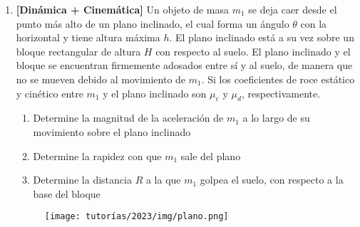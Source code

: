 \documentclass[letterpaper,11pt]{article}
\begin{document}
\begin{enumerate}
\begin{multicols}{2}
\columnbreak

\begin{figure}[H]
    \centering
    \texttt{[image: tutorías/2023/img/ski.png]}
\end{figure}

\end{multicols}
\item \textbf{[Dinámica + Cinemática]} Un objeto de masa $m_1$ se deja caer desde el punto más alto de un plano inclinado, el cual forma un ángulo $\theta$ con la horizontal y tiene altura máxima $h$. El plano inclinado está a su vez sobre un bloque rectangular de altura $H$ con respecto al suelo. El plano inclinado y el bloque se encuentran firmemente adosados entre sí y al suelo, de manera que no se mueven debido al movimiento de $m_1$. Si los coeficientes de roce estático y cinético entre $m_1$ y el plano inclinado son $\mu_e$ y $\mu_d$, respectivamente. 

\begin{enumerate}
    \item Determine la magnitud de la aceleración de $m_1$ a lo largo de su movimiento sobre el plano inclinado

    \item Determine la rapidez con que $m_1$ sale del plano

    \item Determine la distancia $R$ a la que $m_1$ golpea el suelo, con respecto a la base del bloque
\end{enumerate}

\begin{figure}[H]
    \centering
    \texttt{[image: tutorías/2023/img/plano.png]}
\end{figure}

%   

\end{enumerate}
\end{document}
